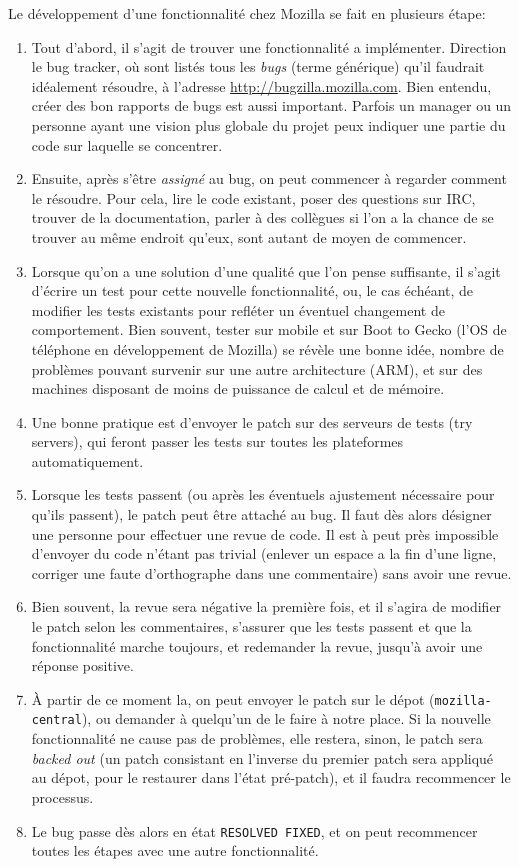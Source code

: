 \documentclass[a4paper,10pt]{article}
\newcommand{\cc}[1]{\texttt{#1}}
\begin{document}
\begin{multicols}{2}
  Le développement d'une fonctionnalité chez Mozilla se fait en plusieurs étape:
  \begin{enumerate}
    \item Tout d'abord, il s'agit de trouver une fonctionnalité a implémenter.
      Direction le bug tracker, où sont listés tous les \emph{bugs} (terme
      générique) qu'il faudrait idéalement résoudre, à l'adresse
      \url{http://bugzilla.mozilla.com}. Bien entendu, créer des bon rapports de
      bugs est aussi important. Parfois un manager ou un personne ayant une
      vision plus globale du projet peux indiquer une partie du code sur
      laquelle se concentrer.
  \item Ensuite, après s'être \emph{assigné} au bug, on peut commencer à
    regarder comment le résoudre. Pour cela, lire le code existant, poser des
    questions sur IRC, trouver de la documentation, parler à des collègues si
    l'on a la chance de se trouver au même endroit qu'eux, sont autant de moyen de
    commencer.
  \item Lorsque qu'on a une solution d'une qualité que l'on pense suffisante, il
    s'agit d'écrire un test pour cette nouvelle fonctionnalité, ou, le cas
    échéant, de modifier les tests existants pour refléter un éventuel
    changement de comportement. Bien souvent, tester sur mobile et sur Boot to
    Gecko (l'OS de téléphone en développement de Mozilla) se révèle une bonne
    idée, nombre de problèmes pouvant survenir sur une autre architecture (ARM),
    et sur des machines disposant de moins de puissance de calcul et de mémoire.
  \item Une bonne pratique est d'envoyer le patch sur des serveurs de tests (try
    servers), qui feront passer les tests sur toutes les plateformes
    automatiquement.
  \item Lorsque les tests passent (ou après les éventuels ajustement nécessaire
    pour qu'ils passent), le patch peut être attaché au bug. Il faut dès alors
    désigner une personne pour effectuer une revue de code. Il est à peut près
    impossible d'envoyer du code n'étant pas trivial (enlever un espace a la fin
    d'une ligne, corriger une faute d'orthographe dans une commentaire) sans
    avoir une revue.
  \item Bien souvent, la revue sera négative la première fois, et il s'agira de
    modifier le patch selon les commentaires, s'assurer que les tests passent et
    que la fonctionnalité marche toujours, et redemander la revue, jusqu'à
    avoir une réponse positive.
  \item À partir de ce moment la, on peut envoyer le patch sur le dépot
    (\cc{mozilla-central}), ou demander à quelqu'un de le faire à notre place.
    Si la nouvelle fonctionnalité ne cause pas de problèmes, elle restera,
    sinon, le patch sera \emph{backed out} (un patch consistant en l'inverse du
    premier patch sera appliqué au dépot, pour le restaurer dans l'état
    pré-patch), et il faudra recommencer le processus.
  \item Le bug passe dès alors en état \cc{RESOLVED FIXED}, et on peut
    recommencer toutes les étapes avec une autre fonctionnalité.
  \end{enumerate}

\end{multicols}
\end{document}
